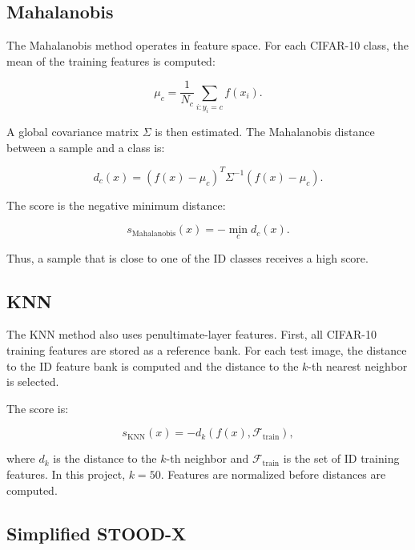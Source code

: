 \documentclass[11pt,a4paper]{article}
\begin{document}
\subsection{Mahalanobis}

The Mahalanobis method operates in feature space.
For each CIFAR-10 class, the mean of the training features is computed:

\begin{equation}
    \mu_c = \frac{1}{N_c}\sum_{i:y_i=c} f(x_i).
\end{equation}

A global covariance matrix $\Sigma$ is then estimated.
The Mahalanobis distance between a sample and a class is:

\begin{equation}
    d_c(x) = (f(x)-\mu_c)^T\Sigma^{-1}(f(x)-\mu_c).
\end{equation}

The score is the negative minimum distance:

\begin{equation}
    s_{\text{Mahalanobis}}(x) = -\min_c d_c(x).
\end{equation}

Thus, a sample that is close to one of the ID classes receives a high score.

\subsection{KNN}

The KNN method also uses penultimate-layer features.
First, all CIFAR-10 training features are stored as a reference bank.
For each test image, the distance to the ID feature bank is computed and the distance to the $k$-th nearest neighbor is selected.

The score is:

\begin{equation}
    s_{\text{KNN}}(x) = -d_k(f(x), \mathcal{F}_{\text{train}}),
\end{equation}

where $d_k$ is the distance to the $k$-th neighbor and $\mathcal{F}_{\text{train}}$ is the set of ID training features.
In this project, $k=50$.
Features are normalized before distances are computed.

\subsection{Simplified STOOD-X}
\end{document}

